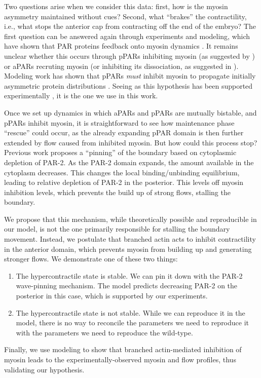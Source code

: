 \documentclass[11pt]{article}
\newcommand{\red}[1]{\color{red}#1\normalcolor}
\newcommand{\6}[1]{#1_{\text{6}}}
\newcommand{\3}[1]{#1_{\text{3}}}
\begin{document}
Two questions arise when we consider this data: first, how is the myosin asymmetry maintained without cues? Second, what ``brakes'' the contractility, i.e., what stops the anterior cap from contracting off the end of the embryo? The first question can be answered again through experiments and modeling, which have shown that PAR proteins feedback onto myosin dynamics \cite{gross2019guiding, beatty20132}. It remains unclear whether this occurs through pPARs inhibiting myosin (as suggested by \cite{beatty20132}) or aPARs recruting myosin (or inhibiting its dissociation, as suggested in \cite{gross2019guiding}). Modeling work has shown that pPARs \emph{must} inhibit myosin to propagate initially asymmetric protein distributions \cite{kravtsova2014actomyosin}. Seeing as this hypothesis has been supported experimentally \cite{munro2004cortical, beatty20132}, it is the one we use in this work.

Once we set up dynamics in which aPARs and pPARs are mutually bistable, and pPARs inhibit myosin, it is straightforward to see how maintenance phase ``rescue'' could occur, as the already expanding pPAR domain is then further extended by flow caused from inhibited myosin. But how could this process stop? Previous work \cite{goehring2011polarization} proposes a ``pinning'' of the boundary \cite{mori2008wave} based on cytoplasmic depletion of PAR-2. As the PAR-2 domain expands, the amount available in the cytoplasm decreases. This changes the local binding/unbinding equilibrium, leading to relative depletion of PAR-2 in the posterior. This levels off myosin inhibition levels, which prevents the build up of strong flows, stalling the boundary.

We propose that this mechanism, while theoretically possible and reproducible in our model, is not the one primarily responsible for stalling the boundary movement. Instead, we postulate that branched actin acts to inhibit contractility in the anterior domain, which prevents myosin from building up and generating stronger flows. We demonstrate \red{one of these two things}:
\begin{enumerate}
\item The hypercontractile state is stable. We can pin it down with the PAR-2 wave-pinning mechanism. The model predicts decreasing PAR-2 on the posterior in this case, which is supported by our experiments. 
\item The hypercontractile state is not stable. While we can reproduce it in the model, there is no way to reconcile the parameters we need to reproduce it with the parameters we need to reproduce the wild-type. 
\end{enumerate}
Finally, we use modeling to show that branched actin-mediated inhibition of myosin leads to the experimentally-observed myosin and flow profiles, thus validating our hypothesis. 
\end{document}

